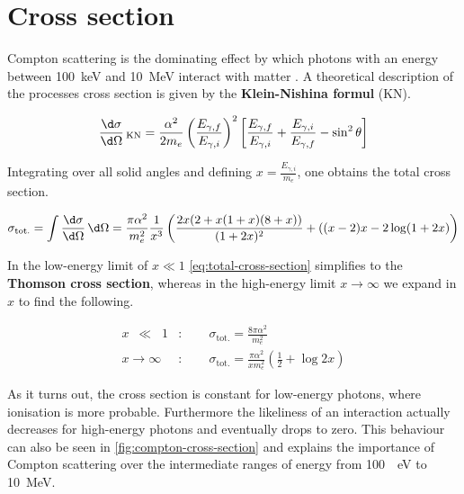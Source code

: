 
\section{Cross section}
\label{sec:compton-cross-section}

Compton scattering is the dominating effect by which photons with an energy between
\SI{100}{\kilo\electronvolt} and \SI{10}{\mega\electronvolt} interact with matter
\cite{damashek1970forward}. A theoretical description of the processes cross section
is given by the \textbf{Klein-Nishina formul} (KN).

\begin{equation}
\label{eq:klein-nishina-cross-section}
\frac{\d\sigma}{\d\Omega}\,_\text{KN} = \frac{\alpha^2}{2m_e}\left(\frac{E_{\gamma,f}}{E_{\gamma,i}}\right)^2\left[\frac{E_{\gamma,f}}{E_{\gamma,i}}+\frac{E_{\gamma,i}}{E_{\gamma,f}}-\sin^2\theta\right]
\end{equation}

Integrating over all solid angles and defining $x=\frac{E_{\gamma,i}}{m_e}$, one
obtains the total cross section.

\begin{equation}
\label{eq:total-cross-section}
\sigma_\text{tot.} = \int \frac{\d\sigma}{\d\Omega}\,\d\Omega = \frac{\pi\alpha^2}{m_e^2}\frac{1}{x^3}\left(\frac{2x(2+x(1+x)(8+x))}{(1+2x)^2} + ((x-2)x-2\log(1+2x)\right)
\end{equation}

In the low-energy limit of $x\ll1$ \autoref{eq:total-cross-section} simplifies to the
\textbf{Thomson cross section}, whereas in the high-energy limit $x\rightarrow\infty$
we expand in $x$ to find the following.

\begin{align*}
x\;\:\ll\;\;1&:\qquad\sigma_\text{tot.} = \frac{8\pi\alpha^2}{m_e^2} \\
x\longrightarrow\infty&:\qquad\sigma_\text{tot.} = \frac{\pi\alpha^2}{x m_e^2}\left(\frac{1}{2} + \log2x\right) 
\end{align*}

As it turns out, the cross section is constant for low-energy photons, where 
ionisation is more probable. Furthermore the likeliness of an interaction actually 
decreases for high-energy photons and eventually drops to zero. This behaviour can 
also be seen in \autoref{fig:compton-cross-section} and explains the importance of 
Compton scattering over the intermediate ranges of energy from \SI{100}{\kilo
\electronvolt} to \SI{10}{\mega\electronvolt}.


